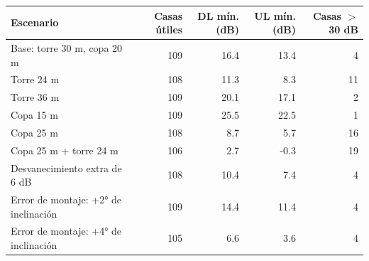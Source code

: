 \begin{tabular}{p{5.6cm}rrrr}\toprule Escenario & Casas útiles & DL mín. (dB) & UL mín. (dB) & Casas $>$30 dB\\\midrule
Base: torre 30 m, copa 20 m & 109 & 16.4 & 13.4 & 4\\
Torre 24 m & 108 & 11.3 & 8.3 & 11\\
Torre 36 m & 109 & 20.1 & 17.1 & 2\\
Copa 15 m & 109 & 25.5 & 22.5 & 1\\
Copa 25 m & 108 & 8.7 & 5.7 & 16\\
Copa 25 m + torre 24 m & 106 & 2.7 & -0.3 & 19\\
Desvanecimiento extra de 6 dB & 108 & 10.4 & 7.4 & 4\\
Error de montaje: +2° de inclinación & 109 & 14.4 & 11.4 & 4\\
Error de montaje: +4° de inclinación & 105 & 6.6 & 3.6 & 4\\
\bottomrule\end{tabular}
